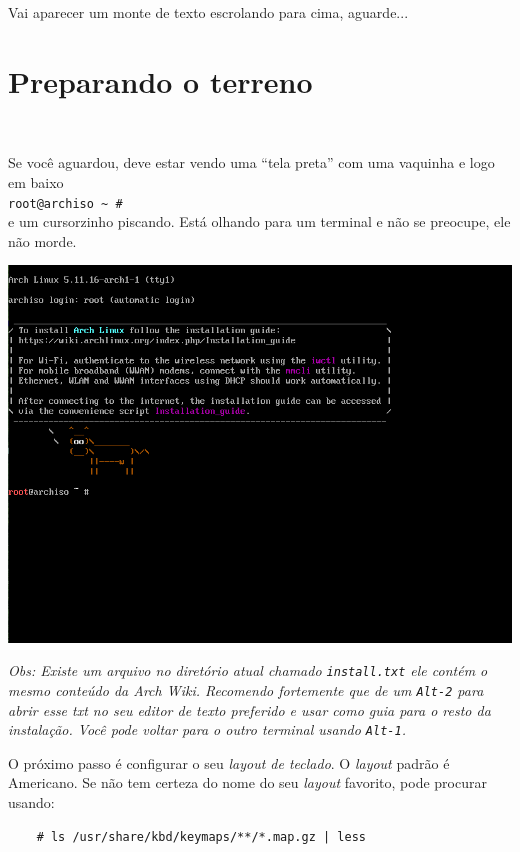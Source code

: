 \documentclass{article}
\newcommand{\obs}[1]{\textit{ Obs:#1 }}
\begin{document}
Vai aparecer um monte de texto escrolando para cima,
aguarde...

\section{Preparando o terreno}\

Se você aguardou, deve estar vendo
uma ``tela preta'' com uma
vaquinha e logo em baixo\\
\texttt{{\color{red}root}@archiso \~{} \#} \\
e um cursorzinho piscando.
Está olhando para um terminal e
não se preocupe, ele não morde.

\begin{center}
    \includegraphics[width=\textwidth]{Imgs/Hello-arch.png}
\end{center}

\obs{
Existe um arquivo no diretório atual chamado
\texttt{install.txt} ele contém o mesmo conteúdo
da Arch Wiki.
Recomendo fortemente que de um \texttt{Alt-2}
para abrir esse txt no seu editor de texto preferido
e usar como guia para o resto da instalação.
Você pode voltar para o outro terminal usando \texttt{Alt-1}.
}

O próximo passo é configurar o seu \emph{layout de teclado}.
O \emph{layout} padrão é Americano.
Se não tem certeza do nome do seu \emph{layout} favorito,
pode procurar usando:

\begin{verbatim}
    # ls /usr/share/kbd/keymaps/**/*.map.gz | less
\end{verbatim}
\end{document}
